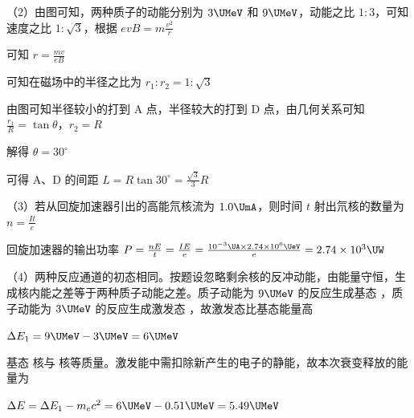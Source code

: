 \documentclass[\gkver]{gaokaozhenti}
\begin{document}
\begin{enumerate}
{（2）由图可知，两种质子的动能分别为 $3\UMeV$ 和 $9\UMeV$，动能之比 $1:3$，可知速度之比 $1:\sqrt{3}$，根据 $evB = m\frac{v^{2}}{r}$

可知 $r = \frac{mv}{eB}$

可知在磁场中的半径之比为 $r_{1}:r_{2} = 1:\sqrt{3}$

由图可知半径较小的打到 A 点，半径较大的打到 D 点，由几何关系可知 $\frac{r_{1}}{R} = \tan\theta$，$r_{2} = R$

解得 $\theta = 30^{\circ}$

可得 A、D 的间距 $L = R\tan 30^{\circ} = \frac{\sqrt{3}}{3}R$


（3）若从回旋加速器引出的高能氘核流为 $1.0\UmA$，则时间 $t$ 射出氘核的数量为 $n = \frac{It}{e}$

回旋加速器的输出功率 $P = \frac{nE}{t} = \frac{IE}{e} = \frac{10^{-3}\UA \times 2.74 \times 10^{6}\UeV}{e} = 2.74 \times 10^{3}\UW$

（4）两种反应通道的初态相同。按题设忽略剩余核的反冲动能，由能量守恒，生成核内能之差等于两种质子动能之差。质子动能为 $9\UMeV$ 的反应生成基态 ，质子动能为 $3\UMeV$ 的反应生成激发态 ，故激发态比基态能量高

$\Delta E_{1} = 9\UMeV - 3\UMeV = 6\UMeV$

基态  核与  核等质量。激发能中需扣除新产生的电子的静能，故本次衰变释放的能量为

$\Delta E = \Delta E_{1} - m_{e}c^{2} = 6\UMeV - 0.51\UMeV = 5.49\UMeV$
}

\end{enumerate}
\end{document}
